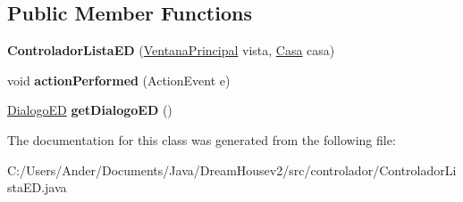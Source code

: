 \subsection*{Public Member Functions}
\begin{DoxyCompactItemize}
\item 
\mbox{\label{classcontrolador_1_1_controlador_lista_e_d_a104b9506109ea05b3d00ffc16041c97d}} 
{\bfseries Controlador\+Lista\+ED} (\mbox{\hyperlink{classvista_1_1_ventana_principal}{Ventana\+Principal}} vista, \mbox{\hyperlink{classmodelo_1_1_casa}{Casa}} casa)
\item 
\mbox{\label{classcontrolador_1_1_controlador_lista_e_d_a314311c80165a8dbc22415253dbecf16}} 
void {\bfseries action\+Performed} (Action\+Event e)
\item 
\mbox{\label{classcontrolador_1_1_controlador_lista_e_d_a3632ab1b0937e0e120ffddbbb453c02d}} 
\mbox{\hyperlink{classvista_1_1_dialogo_e_d}{Dialogo\+ED}} {\bfseries get\+Dialogo\+ED} ()
\end{DoxyCompactItemize}


The documentation for this class was generated from the following file\+:\begin{DoxyCompactItemize}
\item 
C\+:/\+Users/\+Ander/\+Documents/\+Java/\+Dream\+Housev2/src/controlador/Controlador\+Lista\+E\+D.\+java\end{DoxyCompactItemize}
